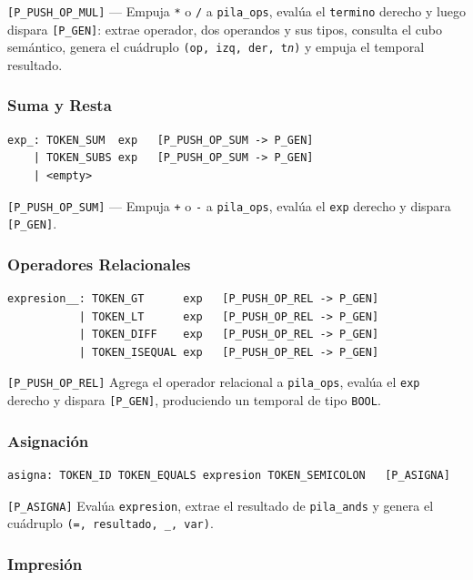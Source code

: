 \documentclass[12pt, letterpaper]{article}
\theoremstyle{definition}
\begin{document}
\texttt{[P\_PUSH\_OP\_MUL]} — Empuja \texttt{*} o \texttt{/} a \texttt{pila\_ops}, evalúa el \texttt{termino} derecho y luego dispara \texttt{[P\_GEN]}: extrae operador, dos operandos y sus tipos, consulta el cubo semántico, genera el cuádruplo \texttt{(op, izq, der, t\textit{n})} y empuja el temporal resultado.

\subsubsection*{Suma y Resta}

\begin{verbatim}
exp_: TOKEN_SUM  exp   [P_PUSH_OP_SUM -> P_GEN]
    | TOKEN_SUBS exp   [P_PUSH_OP_SUM -> P_GEN]
    | <empty>
\end{verbatim}

\texttt{[P\_PUSH\_OP\_SUM]} — Empuja \texttt{+} o \texttt{-} a \texttt{pila\_ops}, evalúa el \texttt{exp} derecho y dispara \texttt{[P\_GEN]}.

\subsubsection*{Operadores Relacionales}

\begin{verbatim}
expresion__: TOKEN_GT      exp   [P_PUSH_OP_REL -> P_GEN]
           | TOKEN_LT      exp   [P_PUSH_OP_REL -> P_GEN]
           | TOKEN_DIFF    exp   [P_PUSH_OP_REL -> P_GEN]
           | TOKEN_ISEQUAL exp   [P_PUSH_OP_REL -> P_GEN]
\end{verbatim}

\texttt{[P\_PUSH\_OP\_REL]} Agrega el operador relacional a \texttt{pila\_ops}, evalúa el \texttt{exp} derecho y dispara \texttt{[P\_GEN]}, produciendo un temporal de tipo \texttt{BOOL}.

\subsubsection*{Asignación}

\begin{verbatim}
asigna: TOKEN_ID TOKEN_EQUALS expresion TOKEN_SEMICOLON   [P_ASIGNA]
\end{verbatim}

\texttt{[P\_ASIGNA]} Evalúa \texttt{expresion}, extrae el resultado de \texttt{pila\_ands} y genera el cuádruplo \texttt{(=, resultado, \_, var)}.

\subsubsection*{Impresión}
\end{document}

